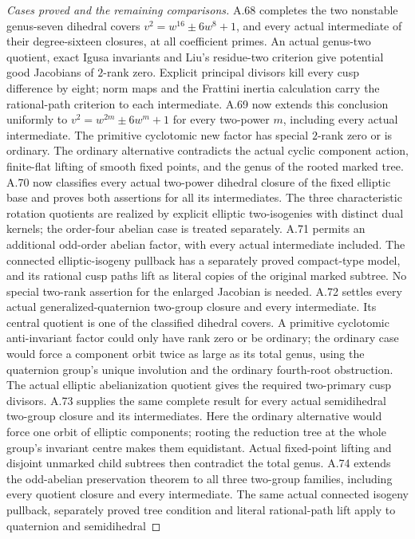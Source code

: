 \begin{proof}[Cases proved and the remaining comparisons]
A.68 completes the two nonstable genus-seven dihedral covers
\(v^2=w^{16}\pm6w^8+1\), and every actual intermediate
of their degree-sixteen closures, at all coefficient primes.
An actual genus-two quotient, exact Igusa invariants and Liu's
residue-two criterion give potential good Jacobians of
\(2\)-rank zero. Explicit principal divisors kill every cusp
difference by eight; norm maps and the Frattini inertia calculation
carry the rational-path criterion to each intermediate.
A.69 now extends this conclusion uniformly to
\(v^2=w^{2m}\pm6w^m+1\) for every two-power \(m\),
including every actual intermediate. The primitive cyclotomic
new factor has special \(2\)-rank zero or is ordinary. The ordinary
alternative contradicts the actual cyclic component action,
finite-flat lifting of smooth fixed points, and the genus of the
rooted marked tree.
A.70 now classifies every actual two-power dihedral closure of
the fixed elliptic base and proves both assertions for all its
intermediates. The three characteristic rotation quotients are
realized by explicit elliptic two-isogenies with distinct dual
kernels; the order-four abelian case is treated separately.
A.71 permits an additional odd-order abelian factor, with every
actual intermediate included. The connected elliptic-isogeny
pullback has a separately proved compact-type model, and its
rational cusp paths lift as literal copies of the original
marked subtree. No special two-rank assertion for the enlarged
Jacobian is needed.
A.72 settles every actual generalized-quaternion two-group
closure and every intermediate. Its central quotient is one
of the classified dihedral covers. A primitive cyclotomic
anti-invariant factor could only have rank zero or be ordinary;
the ordinary case would force a component orbit twice as large
as its total genus, using the quaternion group's unique
involution and the ordinary fourth-root obstruction. The
actual elliptic abelianization quotient gives the required
two-primary cusp divisors.
A.73 supplies the same complete result for every actual
semidihedral two-group closure and its intermediates. Here
the ordinary alternative would force one orbit of elliptic
components; rooting the reduction tree at the whole group's
invariant centre makes them equidistant. Actual fixed-point
lifting and disjoint unmarked child subtrees then contradict
the total genus.
A.74 extends the odd-abelian preservation theorem to all three
two-group families, including every quotient closure and
every intermediate. The same actual connected isogeny
pullback, separately proved tree condition and literal
rational-path lift apply to quaternion and semidihedral

\end{proof}
